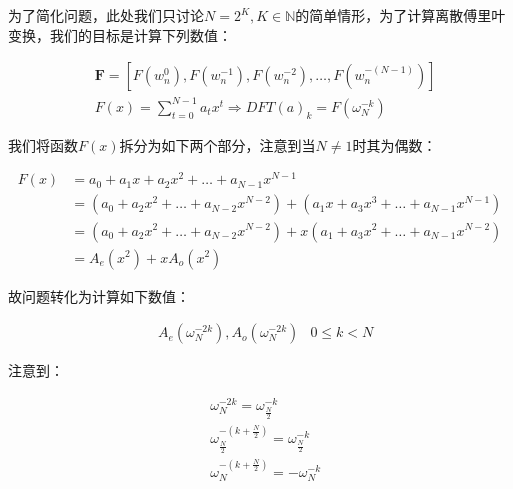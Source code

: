 \documentclass[UTF8]{book}
\begin{document}
为了简化问题，此处我们只讨论$N=2^K, K\in \mathbb{N}$的简单情形，为了计算离散傅里叶变换，我们的目标是计算下列数值：
\begin{large}
    \begin{equation}
        \begin{aligned}
            &\mathbf{F}=\left [ F(w_n^{0}), F(w_n^{-1}), F(w_n^{-2}), \dots, F(w_n^{-(N-1)}) \right ] \\
            &F(x)=\sum_{t=0}^{N-1}a_tx^t \Rightarrow DFT(a)_k=F(\omega_N^{-k})
            \nonumber
        \end{aligned}
    \end{equation}
\end{large}
我们将函数$F(x)$拆分为如下两个部分，注意到当$N\not = 1$时其为偶数：
\begin{large}
    \begin{equation}
        \begin{aligned}
            F(x) &= a_0+a_1x+a_2x^2+\dots +a_{N-1}x^{N-1} \\
            &= (a_0+a_2x^2+\dots +a_{N-2}x^{N-2})+(a_1x+a_3x^3+\dots +a_{N-1}x^{N-1}) \\
            &= (a_0+a_2x^2+\dots +a_{N-2}x^{N-2})+x(a_1+a_3x^2+\dots +a_{N-1}x^{N-2}) \\
            &= A_{e}(x^2)+xA_{o}(x^2)
            \nonumber
        \end{aligned}
    \end{equation}
\end{large}
故问题转化为计算如下数值：
\begin{large}
    \begin{equation}
        \begin{aligned}
            &A_{e}(\omega_N^{-2k}), A_{o}(\omega_N^{-2k}) & 0 \le k <N
            \nonumber
        \end{aligned}
    \end{equation}
\end{large}
注意到：
\begin{large}
    \begin{equation}
        \begin{aligned}
            &\omega_N^{-2k}=\omega_{\frac{N}{2}}^{-k} \\
            &\omega_{\frac{N}{2}}^{-(k+\frac{N}{2})}=\omega_{\frac{N}{2}}^{-k} \\
            &\omega_{N}^{-(k+\frac{N}{2})}=-\omega_{N}^{-k}
            \nonumber
        \end{aligned}
    \end{equation}
\end{large}
\end{document}
